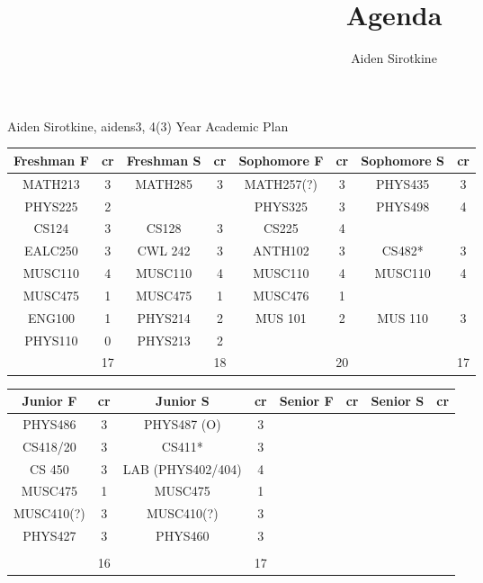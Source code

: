 \documentclass{article}
\date{}
\title{Agenda}
\author{Aiden Sirotkine}
\begin{document}
Aiden Sirotkine, aidens3, 4(3) Year Academic Plan
\begin{center}
\begin{tabular}{| c | c | c | c | c | c | c | c |}
Freshman F& cr & Freshman S & cr & Sophomore F & cr & Sophomore S & cr  \\ \hline
MATH213 & 3 & MATH285 & 3 & MATH257(?) & 3 & PHYS435& 3\\ \hline
PHYS225 & 2 & & & PHYS325 & 3 & PHYS498 & 4\\ \hline
CS124 & 3 & CS128 & 3 & CS225 & 4 &  & \\ \hline
EALC250 & 3 & CWL 242 & 3 & ANTH102 & 3 & CS482* & 3 \\ \hline
MUSC110 & 4 & MUSC110 & 4 & MUSC110 & 4 & MUSC110 & 4\\ \hline
MUSC475 & 1 & MUSC475 & 1 & MUSC476 & 1 & & \\ \hline
ENG100 & 1 & PHYS214 & 2 & MUS 101 & 2 & MUS 110 & 3 \\ \hline
PHYS110 & 0 & PHYS213 & 2\\ \hline
 & 17 & & 18 & & 20 & & 17 \\ \hline


\end{tabular}
\end{center}

\begin{center}
\begin{tabular}{| c | c | c | c | c | c | c | c |}
Junior F& cr & Junior S & cr & Senior F & cr & Senior S & cr  \\ \hline
PHYS486 & 3 &  PHYS487 (O) & 3\\ \hline
CS418/20 & 3 & CS411* & 3 \\ \hline
CS 450 & 3 & LAB (PHYS402/404) & 4 	\\ \hline
MUSC475 & 1 & MUSC475 & 1 \\ \hline
MUSC410(?) & 3 & MUSC410(?) & 3 \\ \hline
PHYS427 & 3 & PHYS460 & 3 \\ \hline
 & & & \\ \hline
& 16 & & 17 \\ \hline


\end{tabular}
\end{center}


\end{document}
